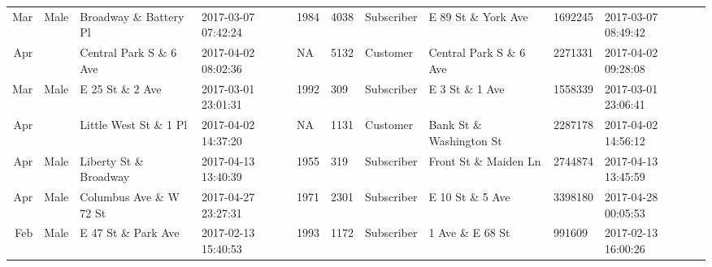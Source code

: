 \documentclass[11pt]{article}
\begin{document}
\begin{tabular}{r|llllllllll}
	 Mar                              & Male                             & Broadway \& Battery Pl          & 2017-03-07 07:42:24              & 1984                             & 4038                             & Subscriber                       & E 89 St \& York Ave             & 1692245                          & 2017-03-07 08:49:42             \\
	 Apr                              &                                  & Central Park S \& 6 Ave         & 2017-04-02 08:02:36              &   NA                             & 5132                             & Customer                         & Central Park S \& 6 Ave         & 2271331                          & 2017-04-02 09:28:08             \\
	 Mar                              & Male                             & E 25 St \& 2 Ave                & 2017-03-01 23:01:31              & 1992                             &  309                             & Subscriber                       & E 3 St \& 1 Ave                 & 1558339                          & 2017-03-01 23:06:41             \\
	 Apr                              &                                  & Little West St \& 1 Pl          & 2017-04-02 14:37:20              &   NA                             & 1131                             & Customer                         & Bank St \& Washington St        & 2287178                          & 2017-04-02 14:56:12             \\
	 Apr                              & Male                             & Liberty St \& Broadway          & 2017-04-13 13:40:39              & 1955                             &  319                             & Subscriber                       & Front St \& Maiden Ln           & 2744874                          & 2017-04-13 13:45:59             \\
	 Apr                              & Male                             & Columbus Ave \& W 72 St         & 2017-04-27 23:27:31              & 1971                             & 2301                             & Subscriber                       & E 10 St \& 5 Ave                & 3398180                          & 2017-04-28 00:05:53             \\
	 Feb                              & Male                             & E 47 St \& Park Ave             & 2017-02-13 15:40:53              & 1993                             & 1172                             & Subscriber                       & 1 Ave \& E 68 St                &  991609                          & 2017-02-13 16:00:26             \\

\end{tabular}
\end{document}
